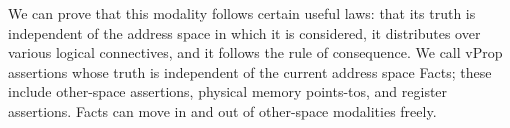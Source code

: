 
We can prove that this modality follows certain useful laws: that its truth is independent of the address
space in which it is considered,  it distributes over various logical connectives, and it follows the rule of
consequence.
We call \textsf{vProp} assertions whose truth is independent of the current address space
\textsf{Fact}s; these include other-space assertions, physical memory points-tos, and register assertions.
\textsf{Fact}s can move in and out of other-space modalities freely.



  



